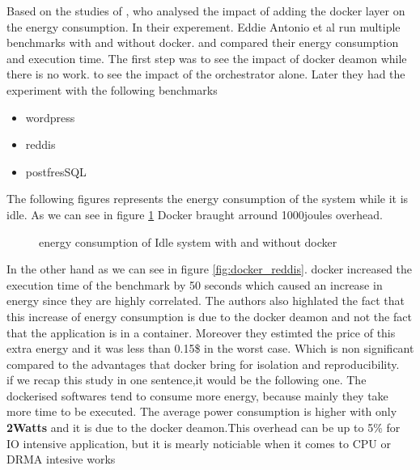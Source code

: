 Based on the studies of \cite{santos2018does}, who analysed the impact of adding the docker layer on the energy consumption.
In their experement. Eddie Antonio et al run multiple benchmarks with and without docker. and compared their energy consumption and execution time.
The first step was to see the impact of docker deamon while there is no work. to see the impact of the orchestrator alone. Later they had the experiment with the following benchmarks
\begin{itemize}
    \item wordpress
    \item reddis
    \item postfresSQL
\end{itemize}
The following figures represents the energy consumption of the system while it is idle. As we can see  in figure \ref{fig:docker_idle} Docker braught arround 1000joules overhead.
\begin{figure}
    \caption{energy consumption of Idle system with and without docker \cite{santos2018does}}\label{fig:docker_idle}
\end{figure}
In the other hand as we can see in figure \ref{fig:docker_reddis}. docker increased the execution time of the benchmark by 50 seconds which caused an increase in energy since they are highly correlated.
The authors also highlated the fact that this increase of energy consumption is due to the docker deamon and not the fact that the application is in a container. Moreover they estimted the price of this extra energy and it was less than 0.15\$ in the worst case. Which is non significant compared to the advantages that docker bring for isolation and reproducibility.\\
if we  recap this study in one sentence,it would be the following one.
The dockerised softwares tend to consume more energy, because mainly they take more time to be executed.
The average power consumption is higher with only \textbf{2Watts} and it is due to the docker deamon.This overhead can be up to 5\% for IO intensive application, but it is mearly noticiable when it comes to CPU or DRMA intesive works



